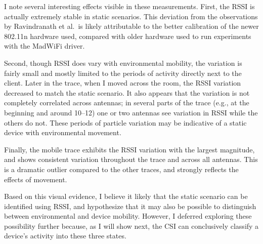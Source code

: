 I note several interesting effects visible in these measurements. First, the RSSI is actually extremely stable in static scenarios. This deviation from the observations by Ravindranath et al.\ is likely attributable to the better calibration of the newer 802.11n hardware used, compared with older hardware used to run experiments with the MadWiFi driver.

Second, though RSSI does vary with environmental mobility, the variation is fairly small and mostly limited to the periods of activity directly next to the client. Later in the trace, when I moved across the room, the RSSI variation decreased to match the static scenario. It also appears that the variation is not completely correlated across antennas; in several parts of the trace (e.g., at the beginning and around 10\s--12\s) one or two antennas see variation in RSSI while the others do not. These periods of particle variation may be indicative of a static device with environmental movement.

Finally, the mobile trace exhibits the RSSI variation with the largest magnitude, and shows consistent variation throughout the trace and across all antennas. This is a dramatic outlier compared to the other traces, and strongly reflects the effects of movement.

Based on this visual evidence, I believe it likely that the static scenario can be identified using RSSI, and hypothesize that it may also be possible to distinguish between environmental and device mobility. However, I deferred exploring these possibility further because, as I will show next, the CSI can conclusively classify a device's activity into these three states.

